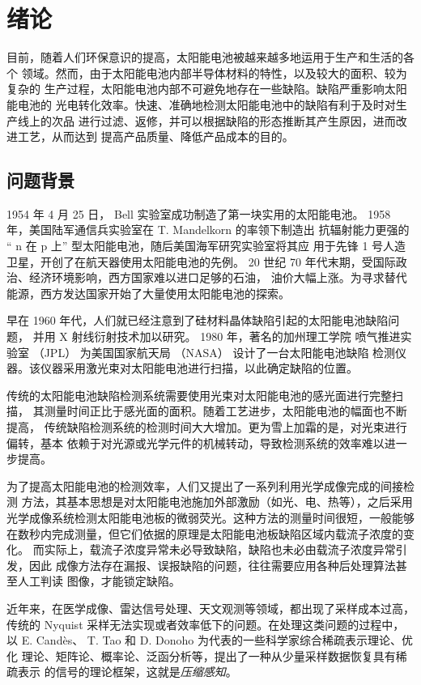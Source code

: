 \chapter{绪论}

目前，随着人们环保意识的提高，太阳能电池被越来越多地运用于生产和生活的各个
领域。然而，由于太阳能电池内部半导体材料的特性，以及较大的面积、较为复杂的
生产过程，太阳能电池内部不可避免地存在一些缺陷。缺陷严重影响太阳能电池的
光电转化效率。快速、准确地检测太阳能电池中的缺陷有利于及时对生产线上的次品
进行过滤、返修，并可以根据缺陷的形态推断其产生原因，进而改进工艺，从而达到
提高产品质量、降低产品成本的目的。

\section{问题背景}

1954 年 4 月 25 日， Bell 实验室成功制造了第一块实用的太阳能电池。
\cite{First} 1958 年，美国陆军通信兵实验室在 T. Mandelkorn 的率领下制造出
抗辐射能力更强的 “ n 在 p 上” 型太阳能电池，随后美国海军研究实验室将其应
用于先锋 1 号人造卫星，开创了在航天器使用太阳能电池的先例。\cite{Vanguard}
20 世纪 70 年代末期，受国际政治、经济环境影响，西方国家难以进口足够的石油，
油价大幅上涨。为寻求替代能源，西方发达国家开始了大量使用太阳能电池的探索。

早在 1960 年代，人们就已经注意到了硅材料晶体缺陷引起的太阳能电池缺陷问题，
并用 X 射线衍射技术加以研究。\cite{SiliconXray} 1980 年，著名的加州理工学院
喷气推进实验室 （JPL） 为美国国家航天局 （NASA） 设计了一台太阳能电池缺陷
检测仪器。该仪器采用激光束对太阳能电池进行扫描，以此确定缺陷的位置。
\cite{JPLDefectAnalyzer}

传统的太阳能电池缺陷检测系统需要使用光束对太阳能电池的感光面进行完整扫描，
其测量时间正比于感光面的面积。随着工艺进步，太阳能电池的幅面也不断提高，
传统缺陷检测系统的检测时间大大增加。更为雪上加霜的是，对光束进行偏转，基本
依赖于对光源或光学元件的机械转动，导致检测系统的效率难以进一步提高。

为了提高太阳能电池的检测效率，人们又提出了一系列利用光学成像完成的间接检测
方法，其基本思想是对太阳能电池施加外部激励（如光、电、热等），之后采用
光学成像系统检测太阳能电池板的微弱荧光。这种方法的测量时间很短，一般能够
在数秒内完成测量，但它们依据的原理是太阳能电池板缺陷区域内载流子浓度的变化。
而实际上，载流子浓度异常未必导致缺陷，缺陷也未必由载流子浓度异常引发，因此
成像方法存在漏报、误报缺陷的问题，往往需要应用各种后处理算法甚至人工判读
图像，才能锁定缺陷。

近年来，在医学成像、雷达信号处理、天文观测等领域，都出现了采样成本过高，
传统的 Nyquist 采样无法实现或者效率低下的问题。在处理这类问题的过程中，以
E. Cand\`es、 T. Tao 和 D. Donoho 为代表的一些科学家综合稀疏表示理论、优化
理论、矩阵论、概率论、泛函分析等，提出了一种从少量采样数据恢复具有稀疏表示
的信号的理论框架，这就是\emph{压缩感知}。

